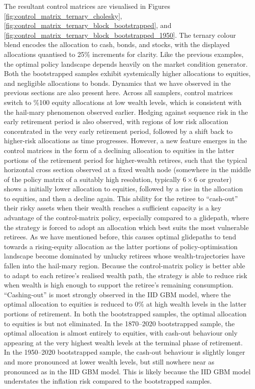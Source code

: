 \documentclass[11pt]{article}
\begin{document}
The resultant control matrices are visualised in Figures \ref{fig:control_matrix_ternary_cholesky}, \ref{fig:control_matrix_ternary_block_bootstrapped}, and \ref{fig:control_matrix_ternary_block_bootstrapped_1950}. The ternary colour blend encodes the allocation to cash, bonds, and stocks, with the displayed allocations quantised to 25\% increments for clarity. Like the previous examples, the optimal policy landscape depends heavily on the market condition generator. Both the bootstrapped samples exhibit systemically higher allocations to equities, and negligible allocations to bonds. Dynamics that we have observed in the previous sections are also present here. Across all samplers, control matrices switch to \%100 equity allocations at low wealth levels, which is consistent with the hail-mary phenomenon observed earlier. Hedging against sequence risk in the early retirement period is also observed, with regions of low risk allocation concentrated in the very early retirement period, followed by a shift back to higher-risk allocations as time progresses. However, a new feature emerges in the control matrices in the form of a declining allocation to equities in the latter portions of the retirement period for higher-wealth retirees, such that the typical horizontal cross section observed at a fixed wealth node (somewhere in the middle of the policy matrix of a suitably high resolution, typically $6\times6$ or greater) shows a initially lower allocation to equities, followed by a rise in the allocation to equities, and then a decline again. This ability for the retiree to ``cash-out'' their risky assets when their wealth reaches a sufficient capacity is a key advantage of the control-matrix policy, especially compared to a glidepath, where the strategy is forced to adopt an allocation which best suits the most vulnerable retirees. As we have mentioned before, this causes optimal glidepaths to tend towards a rising-equity allocation as the latter portions of policy-optimisation landscape become dominated by unlucky retirees whose wealth-trajectories have fallen into the hail-mary region. Because the control-matrix policy is better able to adapt to each retiree's realised wealth path, the strategy is able to reduce risk when wealth is high enough to support the retiree's remaining consumption. ``Cashing-out'' is most strongly observed in the IID GBM model, where the optimal allocation to equities is reduced to 0\% at high wealth levels in the latter portions of retirement. In both the bootstrapped samples, the optimal allocation to equities is but not eliminated. In the 1870--2020 bootstrapped sample, the optimal allocation is almost entirely to equities, with cash-out behaviour only appearing at the very highest wealth levels at the terminal phase of retirement. In the 1950--2020 bootstrapped sample, the cash-out behaviour is slightly longer and more pronounced at lower wealth levels, but still nowhere near as pronounced as in the IID GBM model. This is likely because the IID GBM model understates the inflation risk compared to the bootstrapped samples.
\end{document}
